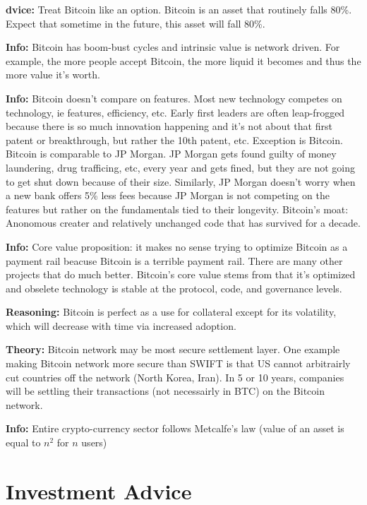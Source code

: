 \documentclass[10pt,twocolumn]{article}
\begin{document}
\textbf{dvice:} Treat Bitcoin like an option. Bitcoin is an asset that routinely
falls 80\%. Expect that sometime in the future, this asset will fall 80\%. 

\textbf{Info:} Bitcoin has boom-bust cycles and intrinsic value is network driven.
For example, the more people accept Bitcoin, the more liquid it becomes and thus
the more value it's worth. 

\textbf{Info:} Bitcoin doesn't compare on features. Most new technology competes on
technology, ie features, efficiency, etc. Early first leaders are often
leap-frogged because there is so much innovation happening and it's not about
that first patent or breakthrough, but rather the 10th patent, etc. Exception is
Bitcoin. Bitcoin is comparable to JP Morgan. JP Morgan gets found guilty of
money laundering, drug trafficing, etc, every year and gets fined, but they are
not going to get shut down because of their size. Similarly, JP Morgan doesn't
worry when a new bank offers 5\% less fees because JP Morgan is not competing on
the features but rather on the fundamentals tied to their longevity. Bitcoin's
moat: Anonomous creater and relatively unchanged code that has survived for a
decade. 

\textbf{Info:} Core value proposition: it makes no sense trying to optimize Bitcoin
as a payment rail beacuse Bitcoin is a terrible payment rail. There are many
other projects that do much better. Bitcoin's core value stems from that it's
optimized and obselete technology is stable at the protocol, code, and
governance levels. 

\textbf{Reasoning:} Bitcoin is perfect as a use for collateral except for its
volatility, which will decrease with time via increased adoption. 

\textbf{Theory:} Bitcoin network may be most secure settlement layer. One example
making Bitcoin network more secure than SWIFT is that US cannot arbitrairly cut
countries off the network (North Korea, Iran). In 5 or 10 years, companies will
be settling their transactions (not necessairly in BTC) on the Bitcoin network. 

\textbf{Info:} Entire crypto-currency sector follows Metcalfe's law (value of an
asset is equal to $n^2$ for $n$ users) 

\section{Investment Advice} %
\end{document}
